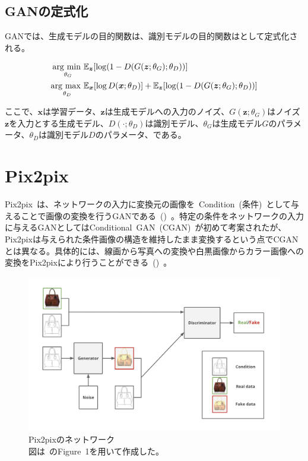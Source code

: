 \clearpage

\subsection{GANの定式化}

GANでは、生成モデルの目的関数は、識別モデルの目的関数はとして定式化される。

\begin{align}
    \label{eq:GAN_G}
    \mathop{\mathrm{arg~min~}}\limits _{\theta_G}& \mathbb{E}_{\boldsymbol{z}}[\log (1-D(G(\boldsymbol{z};\theta_G);\theta_D))]\\
    \label{eq:GAN_D}
    \mathop{\mathrm{arg~max~}}\limits _{\theta_D}& \mathbb{E}_{\boldsymbol{x}}[\log D(\boldsymbol{x};\theta_D)]+\mathbb{E}_{\boldsymbol{z}}[\log (1-D(G(\boldsymbol{z};\theta_G);\theta_D))]
\end{align}


ここで、$\boldsymbol{x}$は学習データ、$\boldsymbol{z}$は生成モデルへの入力のノイズ、$G(\boldsymbol{z};\theta_G)$はノイズ$\boldsymbol{z}$を入力とする生成モデル、$D(\cdot;\theta_D)$は識別モデル、$\theta_G$は生成モデル$G$のパラメータ、$\theta_D$は識別モデル$D$のパラメータ、である。

\section{Pix2pix}

Pix2pix~\cite{pix2pix}は、ネットワークの入力に変換元の画像を~Condition~(条件)~として与えることで画像の変換を行うGANである~()~。特定の条件をネットワークの入力に与えるGANとしてはConditional~GAN~(CGAN)~\cite{CGAN}が初めて考案されたが、Pix2pixは与えられた条件画像の構造を維持したまま変換するという点でCGANとは異なる。具体的には、線画から写真への変換や白黒画像からカラー画像への変換をPix2pixにより行うことができる~()~。

\begin{figure}[b]
\centering
\includegraphics[width=0.9\columnwidth]{figure/pix2pix_net.png}
\caption[Pix2pixのネットワーク]{Pix2pixのネットワーク\\
図は~\cite{pix2pix}のFigure~1を用いて作成した。}
\label{fig:pix2pix_net}
\end{figure}

